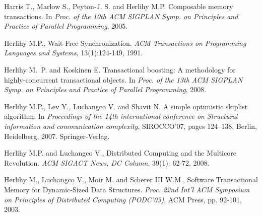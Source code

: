 \begin{thebibliography}{99}
{
Harris T., Marlow S., Peyton-J. S. and Herlihy M.P.
\newblock Composable memory transactions.
\newblock In {\em Proc. of the 10th ACM SIGPLAN Symp. on Principles and
  Practice of Parallel Programming}, 2005.




Herlihy M.P., 
Wait-Free Synchronization. 
{\it ACM Transactions on Programming Languages and Systems}, 
13(1):124-149, 1991. 



Herlihy M.~P. and Koskinen E.
\newblock Transactional boosting: A methodology for highly-concurrent
  transactional objects.
\newblock In {\em Proc. of the 13th ACM SIGPLAN Symp. on Principles and
  Practice of Parallel Programming}, 2008.





Herlihy M.P., Lev Y., Luchangco V. and Shavit N.
\newblock A simple optimistic skiplist algorithm.
\newblock In {\em Proceedings of the 14th international conference on
  Structural information and communication complexity}, SIROCCO'07, pages
  124--138, Berlin, Heidelberg, 2007. Springer-Verlag.



Herlihy M.P.  and Luchangco V.,
Distributed Computing and the Multicore Revolution.
{\it ACM SIGACT News, DC Column}, 39(1): 62-72, 2008.





Herlihy M.,  Luchangco V.,  Moir M. and  Scherer III W.M., 
 Software Transactional Memory for Dynamic-Sized Data Structures. 
{\it  Proc. 22nd  Int'l  ACM Symposium on Principles of  Distributed 
Computing (PODC'03)},  ACM Press, pp. 92-101,  2003. 

% 
% 


}
\end{thebibliography}
